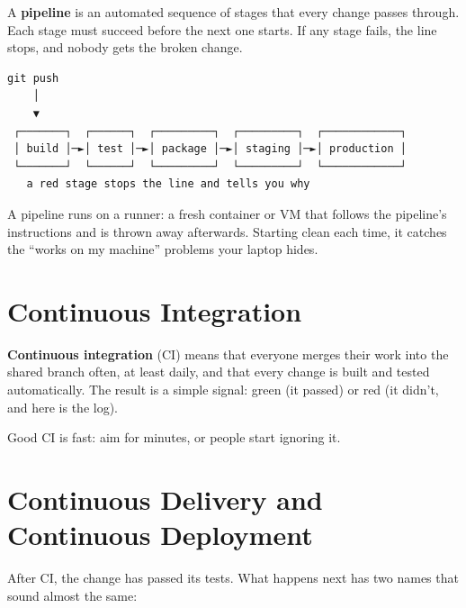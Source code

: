 A \textbf{pipeline} is an automated sequence of stages that every change passes through. Each stage must succeed before the next one starts. If any stage fails, the line stops, and nobody gets the broken change.

\begin{codeblock}
\begin{Verbatim}[breaklines=false, fontsize=\fontsize{8.8}{8.68}\selectfont, fontfamily=diagrammono, formatcom=\diagramlines]
 git push
    │
    ▼
 ┌───────┐  ┌──────┐  ┌─────────┐  ┌─────────┐  ┌────────────┐
 │ build │─►│ test │─►│ package │─►│ staging │─►│ production │
 └───────┘  └──────┘  └─────────┘  └─────────┘  └────────────┘
   a red stage stops the line and tells you why
\end{Verbatim}
\end{codeblock}

A pipeline runs on a runner: a fresh container or VM that follows the pipeline's instructions and is thrown away afterwards. Starting clean each time, it catches the ``works on my machine'' problems your laptop hides.

\section{Continuous Integration}\label{04-pipelines-from-a-commit-to-production:continuous-integration}

\textbf{Continuous integration} (CI) means that everyone merges their work into the shared branch often, at least daily, and that every change is built and tested automatically. The result is a simple signal: green (it passed) or red (it didn't, and here is the log).

Good CI is fast: aim for minutes, or people start ignoring it.


\section{Continuous Delivery and Continuous Deployment}\label{04-pipelines-from-a-commit-to-production:continuous-delivery-and-continuous-deployment}

After CI, the change has passed its tests. What happens next has two names that sound almost the same:

